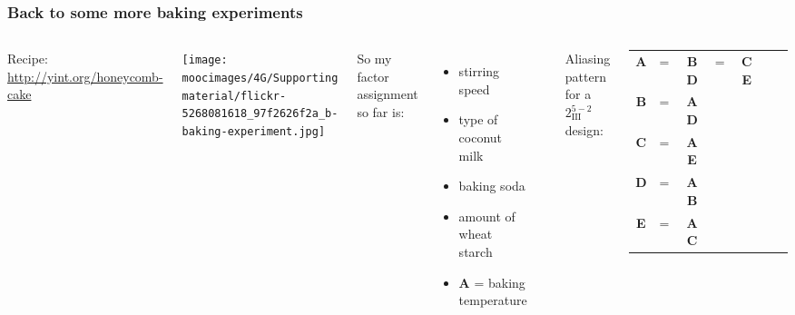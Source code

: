 \documentclass[handout,11pt,aspectratio=169,mathserif]{beamer}
\begin{document}
\begin{frame}\frametitle{Back to some more baking experiments}
	\begin{columns}[T]
		
			\vspace{1cm}
			{\small Recipe: \href{http://yint.org/honeycomb-cake}{http://yint.org/honeycomb-cake}}
		
			\vspace{1cm}
		
			\centerline{\texttt{[image: \\moocimages/4G/Supporting material/flickr-5268081618\_97f2626f2a\_b-baking-experiment.jpg]}}
			
		
			{\color{myOrange}So my factor assignment so far is:}
			\begin{itemize}
				\item	stirring speed
				\item	type of coconut milk
				\item	baking soda
				\item	amount of wheat starch
				\item	\textbf{A} = baking temperature
			\end{itemize}
			
			\vspace{0.4cm}
			\hrule
			
			\vspace{0.1cm}
			Aliasing pattern for a $2^{5-2}_{\textrm{III}}$ design:
			\begin{tabulary}{\linewidth}{ccccccc}				
				\textbf{A} & = & \textbf{BD} & = & \textbf{CE}  \\
				\textbf{B} & = & \textbf{AD} & & \\
				\textbf{C} & = & \textbf{AE} & & \\
				\textbf{D} & = & \textbf{AB} & & \\
				\textbf{E} & = & \textbf{AC} & & 
			\end{tabulary}
			
	\end{columns}
	
	\vspace{1cm}

	
\end{frame}
\end{document}
